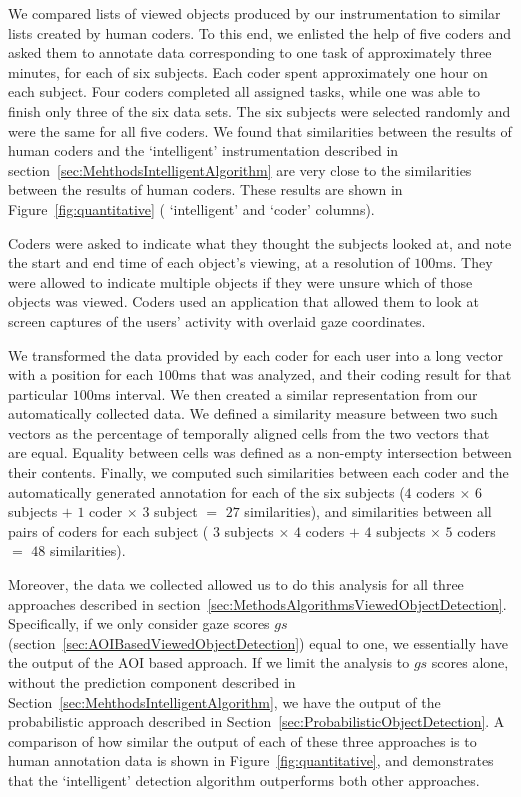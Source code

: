 We compared lists of viewed objects produced by our instrumentation to similar lists created by human coders. To this end, we enlisted the help of five coders and asked them to annotate data corresponding to one task of approximately three minutes, for each of six subjects.  Each coder spent approximately one hour on each subject. Four coders completed all assigned tasks, while one was able to finish only three of the six data sets. The six subjects were selected randomly and were the same for all five coders. We found that similarities between the results of human coders and the `intelligent' instrumentation described in section~\ref{sec:MehthodsIntelligentAlgorithm} are very close to the similarities between the results of human coders. These results are shown in Figure~\ref{fig:quantitative} ( `intelligent' and `coder' columns).

Coders were asked to indicate what they thought the subjects looked at, and note the start and end time of each object's viewing, at a resolution of $100$ms. They were allowed to indicate multiple objects if they were unsure which of those objects was viewed. Coders used an application that allowed them to look at screen captures of the users' activity with overlaid gaze coordinates. 

We transformed the data provided by each coder for each user into a long vector with a position for each $100$ms that was analyzed, and their coding result for that particular $100$ms interval. We then created a similar representation from our automatically collected data. We defined a similarity measure between two such vectors as the percentage of temporally aligned cells from the two vectors that are equal. Equality between cells was defined as a non-empty intersection between their contents. Finally, we computed such similarities between each coder and the automatically generated annotation for each of the six subjects ($4$ coders $\times$ $6$ subjects $+$ $1$ coder $\times$ $3$ subject $=$ $27$ similarities), and similarities between all pairs of coders for each subject ( $3$ subjects $\times$ $4$ coders $+$ $4$ subjects $\times$ $5$ coders $=$ $48$ similarities). 

Moreover, the data we collected allowed us to do this analysis for all three approaches described in section~\ref{sec:MethodsAlgorithmsViewedObjectDetection}. Specifically, if we only consider gaze scores $gs$ (section~\ref{sec:AOIBasedViewedObjectDetection}) equal to one, we essentially have the output of the AOI based approach. If we limit the analysis to $gs$ scores alone, without the prediction component described in Section~\ref{sec:MehthodsIntelligentAlgorithm}, we have the output of the probabilistic approach described in Section~\ref{sec:ProbabilisticObjectDetection}. A comparison of how similar the output of each of these three approaches is to human annotation data is shown in Figure~\ref{fig:quantitative}, and demonstrates that the `intelligent' detection algorithm outperforms both other approaches.

